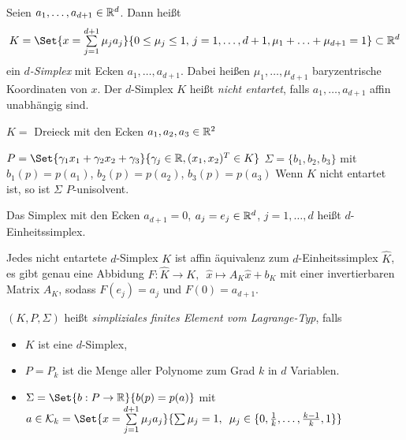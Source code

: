 \documentclass{cheat-sheet}
\begin{document}

\begin{defn}
  Seien $a_1, \ldots, a_{d+1} \in \mathbb{R}^d$.
  Dann heißt
  \[
    K = \Set{x = \sum_{j=1}^{d+1} \mu_j a_j}{0 \leq \mu_j \leq 1, \, j = 1, \ldots, d + 1, \mu_1 + \ldots + \mu_{d+1} = 1} \subset \R^d
  \]
  ein \emph{$d$-Simplex} mit Ecken $a_1, \ldots, a_{d+1}$.
  Dabei heißen $\mu_1, \ldots, \mu_{d+1}$ baryzentrische Koordinaten von $x$.
  Der $d$-Simplex $K$ heißt \emph{nicht entartet}, falls $a_1, \ldots, a_{d+1}$ affin unabhängig sind.
\end{defn}



$K = $ Dreieck mit den Ecken $a_1, a_2, a_3 \in \mathbb{R}^2$

$P = \Set{ \gamma_1 x_1  + \gamma_2 x_2 + \gamma_3}{\gamma_j \in \R, (x_1, x_2)^T \in K}$
$\Sigma = \{ b_1, b_2, b_3 \}$ mit $b_1(p) = p(a_1)$, $b_2(p) = p(a_2)$, $b_3(p) = p(a_3)$
Wenn $K$ nicht entartet ist, so ist $\Sigma$ $P$-unisolvent.

\begin{defn}
  Das Simplex mit den Ecken $a_{d+1} = 0$, $a_j = e_j \in \mathbb{R}^d$, $j = 1, \ldots, d$ heißt $d$-Einheitssimplex.
\end{defn}

\begin{lem}
  Jedes nicht entartete $d$-Simplex $K$ ist affin äquivalenz zum $d$-Einheitssimplex $\hat{K}$, \dh{} es gibt genau eine Abbidung $F : \hat{K} \to K, \enspace \hat{x} \mapsto A_K \hat{x} + b_K$ mit einer invertierbaren Matrix $A_K$, sodass $F(e_j) = a_j$ und $F(0) = a_{d+1}$.
\end{lem}

\begin{defn}
  $(K, P, \Sigma)$ heißt \emph{simpliziales finites Element vom Lagrange-Typ}, falls
  \begin{itemize}
    \item $K$ ist eine $d$-Simplex,
    \item $P = P_k$ ist die Menge aller Polynome zum Grad $k$ in $d$ Variablen.
    \item $\Sigma = \Set{b : P \to \R}{b(p) = p(a)}$ mit $a \in \mathcal{K}_k = \Set{x = \sum_{j=1}^{d+1} \mu_j a_j}{\sum \mu_j = 1, \enspace \mu_j \in \{ 0, \tfrac{1}{k}, \ldots, \tfrac{k-1}{k}, 1 \}}$
  \end{itemize}
\end{defn}
\end{document}
